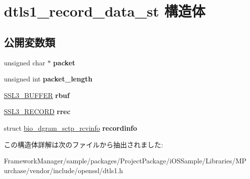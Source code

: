 \hypertarget{structdtls1__record__data__st}{}\section{dtls1\+\_\+record\+\_\+data\+\_\+st 構造体}
\label{structdtls1__record__data__st}
\subsection*{公開変数類}
\begin{DoxyCompactItemize}
\item 
\hypertarget{structdtls1__record__data__st_af010cf2b401153c4312245f1d62edc95}{}unsigned char $\ast$ {\bfseries packet}\label{structdtls1__record__data__st_af010cf2b401153c4312245f1d62edc95}

\item 
\hypertarget{structdtls1__record__data__st_a37b63c2a75775b814e855a5fc59dca26}{}unsigned int {\bfseries packet\+\_\+length}\label{structdtls1__record__data__st_a37b63c2a75775b814e855a5fc59dca26}

\item 
\hypertarget{structdtls1__record__data__st_ae1bd1518437b259efb71f1a80b612213}{}\hyperlink{structssl3__buffer__st}{S\+S\+L3\+\_\+\+B\+U\+F\+F\+E\+R} {\bfseries rbuf}\label{structdtls1__record__data__st_ae1bd1518437b259efb71f1a80b612213}

\item 
\hypertarget{structdtls1__record__data__st_a4b62074b684a63163d87bfbf27bc8453}{}\hyperlink{structssl3__record__st}{S\+S\+L3\+\_\+\+R\+E\+C\+O\+R\+D} {\bfseries rrec}\label{structdtls1__record__data__st_a4b62074b684a63163d87bfbf27bc8453}

\item 
\hypertarget{structdtls1__record__data__st_a0b4f7a6a839c605efd493b4c6c0a437b}{}struct \hyperlink{structbio__dgram__sctp__rcvinfo}{bio\+\_\+dgram\+\_\+sctp\+\_\+rcvinfo} {\bfseries recordinfo}\label{structdtls1__record__data__st_a0b4f7a6a839c605efd493b4c6c0a437b}

\end{DoxyCompactItemize}


この構造体詳解は次のファイルから抽出されました\+:\begin{DoxyCompactItemize}
\item 
Framework\+Manager/sample/packages/\+Project\+Package/i\+O\+S\+Sample/\+Libraries/\+M\+Purchase/vendor/include/openssl/dtls1.\+h\end{DoxyCompactItemize}
